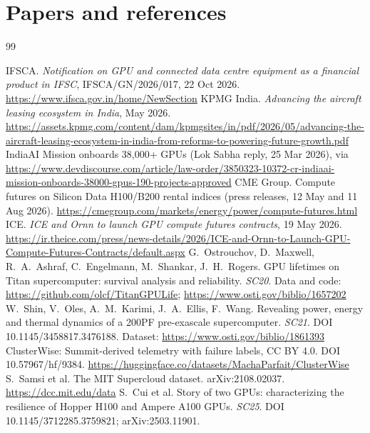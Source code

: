 \documentclass[10pt]{article}
\begin{document}
\section{Papers and references}
\vspace{-2pt}
\begingroup
\renewcommand{\section}[2]{}
\small
\begin{thebibliography}{99}\setlength{\itemsep}{1pt}

 IFSCA. \emph{Notification on GPU and connected data centre equipment as a financial product in IFSC}, IFSCA/GN/2026/017, 22 Oct 2026. \url{https://www.ifsca.gov.in/home/NewSection}
 KPMG India. \emph{Advancing the aircraft leasing ecosystem in India}, May 2026. \url{https://assets.kpmg.com/content/dam/kpmgsites/in/pdf/2026/05/advancing-the-aircraft-leasing-ecosystem-in-india-from-reforms-to-powering-future-growth.pdf}
 IndiaAI Mission onboards 38,000+ GPUs (Lok Sabha reply, 25 Mar 2026), via \url{https://www.devdiscourse.com/article/law-order/3850323-10372-cr-indiaai-mission-onboards-38000-gpus-190-projects-approved}
 CME Group. Compute futures on Silicon Data H100/B200 rental indices (press releases, 12 May and 11 Aug 2026). \url{https://cmegroup.com/markets/energy/power/compute-futures.html}
 ICE. \emph{ICE and Ornn to launch GPU compute futures contracts}, 19 May 2026. \url{https://ir.theice.com/press/news-details/2026/ICE-and-Ornn-to-Launch-GPU-Compute-Futures-Contracts/default.aspx}
 G.~Ostrouchov, D.~Maxwell, R.~A.~Ashraf, C.~Engelmann, M.~Shankar, J.~H.~Rogers. GPU lifetimes on Titan supercomputer: survival analysis and reliability. \emph{SC20}. Data and code: \url{https://github.com/olcf/TitanGPULife}; \url{https://www.osti.gov/biblio/1657202}
 W.~Shin, V.~Oles, A.~M.~Karimi, J.~A.~Ellis, F.~Wang. Revealing power, energy and thermal dynamics of a 200PF pre-exascale supercomputer. \emph{SC21}. DOI 10.1145/3458817.3476188. Dataset: \url{https://www.osti.gov/biblio/1861393}
 ClusterWise: Summit-derived telemetry with failure labels, CC BY 4.0. DOI 10.57967/hf/9384. \url{https://huggingface.co/datasets/MachaParfait/ClusterWise}
 S.~Samsi et al. The MIT Supercloud dataset. arXiv:2108.02037. \url{https://dcc.mit.edu/data}
 S.~Cui et al. Story of two GPUs: characterizing the resilience of Hopper H100 and Ampere A100 GPUs. \emph{SC25}. DOI 10.1145/3712285.3759821; arXiv:2503.11901.

\end{thebibliography}
\end{document}
